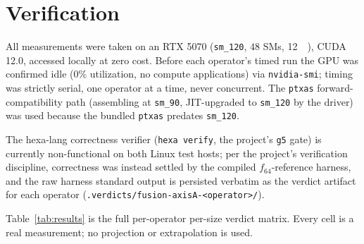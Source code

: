 \documentclass[11pt,a4paper]{article}
\begin{document}
\section{Verification}
\label{sec:verification}

All measurements were taken on an RTX 5070 (\texttt{sm\_120}, $48$ SMs,
\SI{12}{\giga\byte}), CUDA 12.0, accessed locally at zero cost. Before each
operator's timed run the GPU was confirmed idle ($0\%$ utilization, no compute
applications) via \texttt{nvidia-smi}; timing was strictly serial, one operator
at a time, never concurrent. The \texttt{ptxas} forward-compatibility path
(assembling at \texttt{sm\_90}, JIT-upgraded to \texttt{sm\_120} by the driver)
was used because the bundled \texttt{ptxas} predates \texttt{sm\_120}.

The hexa-lang correctness verifier (\texttt{hexa verify}, the project's
\texttt{g5} gate) is currently non-functional on both Linux test hosts; per the
project's verification discipline, correctness was instead settled by the
compiled $f_{64}$-reference harness, and the raw harness standard output is
persisted verbatim as the verdict artifact for each operator
(\texttt{.verdicts/fusion-axisA-<operator>/}).

Table~\ref{tab:results} is the full per-operator per-size verdict matrix. Every
cell is a real measurement; no projection or extrapolation is used.
\end{document}

